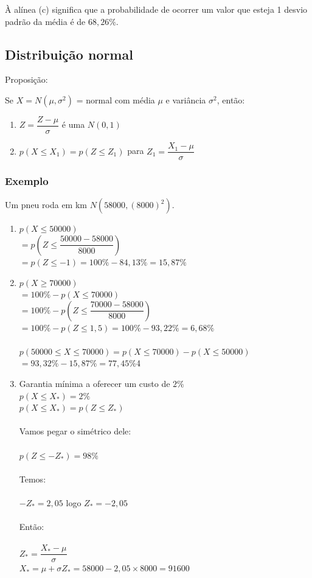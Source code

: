 \documentclass[a4paper]{article}
\begin{document}
	À alínea (c) significa que a probabilidade de ocorrer um valor que esteja 1 desvio padrão da média é de $68,26\%$.
	
	\subsection{Distribuição normal}
	
	Proposição:
	
	Se $X = N(\mu, \sigma^2)$ = normal com média $\mu$ e variância $\sigma^2$, então:
	
	\begin{enumerate}
		\item $Z = \dfrac{Z-\mu}{\sigma}$ é uma $N(0,1)$
		\item $p(X \leq X_1) = p(Z \leq Z_1)$ para $Z_1 = \dfrac{X_1 - \mu}{\sigma}$
	\end{enumerate}

	\subsubsection{Exemplo}
	
	Um pneu roda em km $N\left(58000, (8000)^2\right)$.
	
	\begin{enumerate}[label=\alph*.]
		\item $p(X \leq 50000)$ \\
		$= p\left(Z \leq \dfrac{50000 - 58000}{8000}\right)$ \\
		$= p(Z \leq -1) = 100\% - 84,13\% = 15,87\%$
		\item $p(X \geq 70000)$ \\
		$=100\% - p(X \leq 70000)$ \\
		$=100\% - p\left( Z \leq \dfrac{70000 - 58000}{8000} \right)$ \\
		$= 100\% - p(Z \leq 1,5) = 100\% - 93,22\% = 6,68\%$ \\ \\
		$p(50000 \leq X \leq 70000) = p(X \leq 70000) - p(X \leq 50000)$ \\
		$= 93,32\% - 15,87\% = 77,45\%$4
		\item Garantia mínima a oferecer um custo de $2\%$ \\
		$p(X \leq X_*) = 2\%$ \\
		$p(X \leq X_*) = p(Z \leq Z_*)$ \\
		\\
		Vamos pegar o simétrico dele: \\
		\\
		$p(Z \leq -Z_*) = 98\%$ \\
		\\
		Temos: \\
		\\
		$-Z_* = 2,05$ logo $Z_* = -2,05$ \\
		\\
		Então: \\
		\\
		$Z_* = \dfrac{X_* - \mu}{\sigma}$ \\
		$X_* = \mu + \sigma Z_* = 58000 - 2,05 \times 8000 = 91600$
	\end{enumerate}
	
\end{document}
